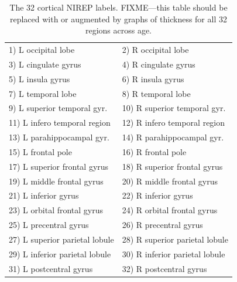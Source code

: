
\begin{table}
\centering
\begin{tabular*}{0.45\textwidth}{@{\extracolsep{\fill}} l l}
\toprule
  1) L occipital lobe & 2) R occipital lobe \\
  3) L cingulate gyrus & 4) R cingulate gyrus \\
  5) L insula gyrus & 6) R insula gyrus \\
  7) L temporal lobe & 8) R temporal lobe \\
  9) L superior temporal gyr. & 10) R superior temporal gyr. \\
  11) L infero temporal region & 12) R infero temporal region \\
  13) L parahippocampal gyr. & 14) R parahippocampal gyr. \\
  15) L frontal pole & 16) R frontal pole \\
  17) L superior frontal gyrus & 18) R superior frontal gyrus \\
  19) L middle frontal gyrus & 20) R middle frontal gyrus \\
  21) L inferior gyrus & 22) R inferior gyrus \\
  23) L orbital frontal gyrus & 24) R orbital frontal gyrus \\
  25) L precentral gyrus & 26) R precentral gyrus \\
  27) L superior parietal lobule & 28) R superior parietal lobule \\
  29) L inferior parietal lobule & 30) R inferior parietal lobule \\
  31) L postcentral gyrus & 32)   R postcentral gyrus \\  
\bottomrule
\end{tabular*}
\caption{The 32 cortical NIREP labels.  FIXME---this table should be
  replaced with or augmented by graphs of thickness for all 32 regions
  across age.}
\label{table:nirep_labels}
\end{table}

